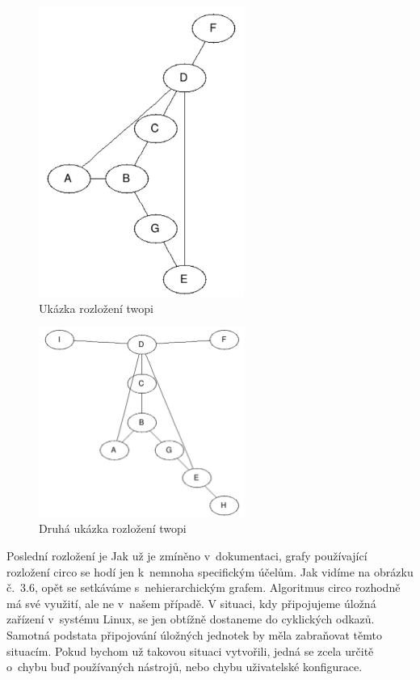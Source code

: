 \documentclass[color,table,oneside,nolot,nolof]{fithesis}
\begin{document}
\begin{figure}[h!]
	\label{fig:Ukázka rozložení twopi}
	\caption{Ukázka rozložení twopi}
	\centering
	\includegraphics[width=0.6\textwidth]{pictures/twopi_example.png} 
\end{figure}
\begin{figure}
	\label{fig:Ukázka rozložení twopi}
	\caption{Druhá ukázka rozložení twopi}
	\centering
	\includegraphics[width=0.6\textwidth]{pictures/twopi_example_2.png} 
\end{figure}

	Poslední rozložení je \cite{graphviz_layout} 
	Jak už je zmíněno v~dokumentaci, grafy používající rozložení 
	circo se hodí jen k~nemnoha specifickým účelům. Jak vidíme na obrázku č.~3.6, opět se setkáváme s~nehierarchickým grafem. Algoritmus circo rozhodně má své využití, ale ne v~našem případě. V
	situaci, kdy připojujeme úložná zařízení v~systému Linux, se jen obtížně dostaneme do cyklických odkazů. Samotná podstata připojování úložných jednotek by měla zabraňovat těmto
	situacím. Pokud bychom už takovou situaci vytvořili, jedná se zcela určitě o~chybu buď používaných nástrojů, nebo chybu uživatelské konfigurace. 
\end{document}

